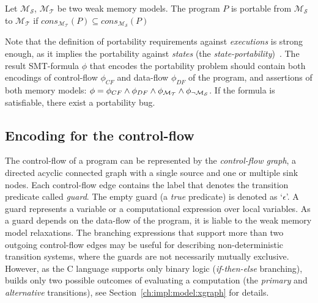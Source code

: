 \begin{definition}[Portability]
Let $\mathcal{M_S}$, $\mathcal{M_T}$ be two weak memory models.
The program $P$ is portable from $\mathcal{M_S}$ to $\mathcal{M_T}$ if 
$\textit{cons}_{\mathcal{M_T}}(P) \subseteq \textit{cons}_{\mathcal{M_S}}(P)$
\end{definition}

Note that the definition of portability requirements against \textit{executions} is strong enough, as it implies the portability against \textit{states} (the \textit{state-portability})~\cite{Porthos17b}.
The result SMT-formula $\phi$ that encodes the portability problem should contain both encodings of control-flow $\phi_{CF}$ and data-flow $\phi_{DF}$ of the program, and assertions of both memory models: ${\phi = \phi_{CF} \land \phi_{DF} \land \phi_{\mathcal{M_T}} \land \phi_{\lnot\mathcal{M_S}}}$.
If the formula is satisfiable, there exist a portability bug.


\subsection{Encoding for the control-flow} %
\label{ch:enc:bmc:cf}

The control-flow of a program can be represented by the \textit{control-flow graph}, a directed acyclic connected graph with a single source and one or multiple sink nodes.
Each control-flow edge contains the label that denotes the transition predicate called \textit{guard}.
The empty guard (a \textit{true} predicate) is denoted as `$\epsilon$'.
A guard represents a variable or a computational expression over local variables.
As a guard depends on the data-flow of the program, it is liable to the weak memory model relaxations.
The branching expressions that support more than two outgoing control-flow edges may be useful for describing non-deterministic transition systems, where the guards are not necessarily mutually exclusive.
However, as the C language supports only binary logic (\textit{if-then-else} branching), \porthos[2] builds only two possible outcomes of evaluating a computation (the \textit{primary} and \textit{alternative} transitions), see Section~\ref{ch:impl:model:xgraph} for details.

